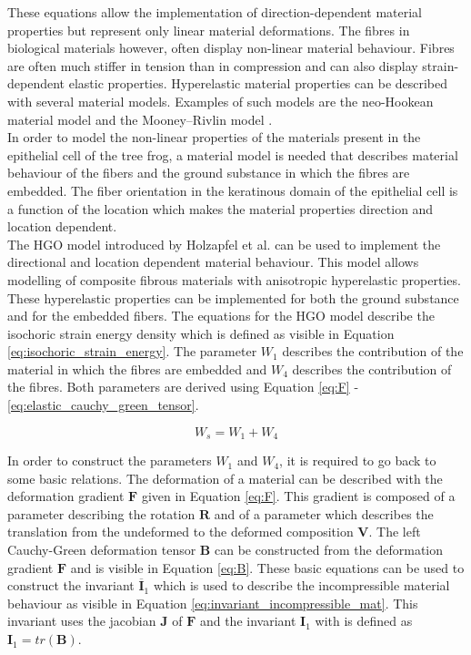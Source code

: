 \qquad These equations allow the implementation of direction-dependent material properties but represent only linear material deformations. The fibres in biological materials however, often display non-linear material behaviour. Fibres are often much stiffer in tension than in compression \cite{li2009three} and can also display strain-dependent elastic properties. Hyperelastic material properties can be described with several material models. Examples of such models are the neo-Hookean material model \cite{ogden1997non} and the Mooney–Rivlin model \cite{mooney1940theory}.\\

\qquad In order to model the non-linear properties of the materials present in the epithelial cell of the tree frog, a material model is needed that describes material behaviour of the fibers and the ground substance in which the fibres are embedded. The fiber orientation in the keratinous domain of the epithelial cell is a function of the location which makes the material properties direction and location dependent.\\

\qquad The HGO model introduced by Holzapfel et al.\cite{holzapfel2000new} can be used to implement the directional and location dependent material behaviour. This model allows modelling of composite fibrous materials with anisotropic hyperelastic properties. These hyperelastic properties can be implemented for both the ground substance and for the embedded fibers. The equations for the HGO model describe the isochoric strain energy density which is defined as visible in Equation \ref{eq:isochoric_strain_energy}. The parameter $W_{1}$ describes the contribution of the material in which the fibres are embedded and $W_{4}$ describes the contribution of the fibres. Both parameters are derived using Equation \ref{eq:F} - \ref{eq:elastic_cauchy_green_tensor}. 
  
\begin{equation}
      W_s = W_{1} + W_{4}
      \label{eq:isochoric_strain_energy}
\end{equation}

\qquad In order to construct the parameters $W_1$ and $W_4$, it is required to go back to some basic relations. The deformation of a material can be described with the deformation gradient $\textbf{F}$ given in Equation \ref{eq:F}. This gradient is composed of a parameter describing the rotation $\textbf{R}$ and of a parameter which describes the translation from the undeformed to the deformed composition $\textbf{V}$. The left Cauchy-Green deformation tensor $\textbf{B}$ can be constructed from the deformation gradient $\textbf{F}$ and is visible in Equation \ref{eq:B}. These basic equations can be used to construct the invariant $\overline{\textbf{I}}_{1}$ which is used to describe the incompressible material behaviour as visible in Equation \ref{eq:invariant_incompressible_mat}. This invariant uses the jacobian $\textbf{J}$ of $\textbf{F}$ and the invariant $\textbf{I}_{1}$ with is defined as $\textbf{I}_{1} = tr(\textbf{B})$.

